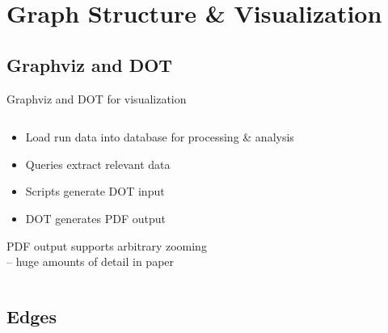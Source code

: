 \documentclass{beamer}
\begin{document}
\section{Graph Structure \& Visualization}

\subsection{Graphviz and DOT}

\begin{frame}{Graphviz and DOT for visualization}
\begin{columns}
\begin{column}{.6\textwidth}
\begin{itemize}
    \setlength\itemsep{.5em}
	\item Load run data into database for processing \& analysis
    \item Queries extract relevant data
    \item Scripts generate DOT input
    \item DOT generates PDF output
\end{itemize}
\vspace{0.5cm}

PDF output supports arbitrary zooming \\ \hspace{.5cm} -- huge amounts of detail in paper
\end{column}
\begin{column}{.4\textwidth}
\end{column}
\end{columns}
\end{frame}

\subsection[Edges]{Edges}
\end{document}
